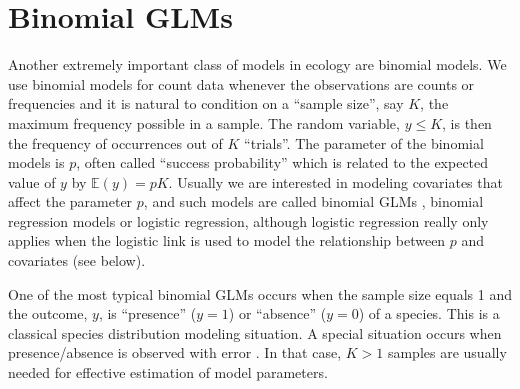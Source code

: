 {{%





\section{Binomial GLMs}

Another extremely important class of models in ecology are
binomial models. We use binomial models for count data whenever the
observations are counts or frequencies and it is natural to condition
on a ``sample size'', say $K$, the maximum frequency possible in a sample.
 The random variable, $y \le K$, is then the
frequency of occurrences out of $K$ ``trials''. The parameter of the binomial
models is $p$, often called ``success probability'' which is related
to the expected value of $y$ by $\mathbb{E}(y) = pK$. Usually we are interested
in modeling covariates that affect the parameter $p$, and such models
are called binomial GLMs , binomial
regression models or logistic regression, although logistic regression
 really only applies when the logistic link is used to model
the relationship between $p$ and covariates (see below).

One of the most typical binomial GLMs occurs when the sample size
equals 1 and the outcome, $y$, is ``presence'' ($y=1$) or ``absence''
($y=0$) of a species. This is a classical species distribution
modeling situation. A special situation occurs when presence/absence
is observed with error \citep{mackenzie_etal:2002,tyre_etal:2003}.
In that case, $K>1$ samples
are usually needed for effective estimation of model parameters.

}}
